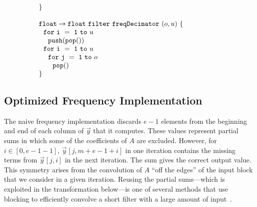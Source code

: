 \begin{transformation}
\begin{equation}
\begin{array}{ll}
    {\tt \}} \\ ~ \\
    {\tt float \rightarrow float}~{\tt filter~freqDecimator~}(o, u){\tt ~\{} & \hspace{40pt}\\
    ~~{\tt for~i~=~1~to~}u \\
    ~~~~{\tt push(pop())} \\
    ~~{\tt for~i~=~1~to~}u \\
    ~~~~{\tt for~j~=~1~to~}o \\
    ~~~~~~{\tt pop()} \\
    {\tt \}}
  \end{array}
\end{equation}
\label{trans:freq1}
\end{transformation}

\subsection{Optimized Frequency Implementation}

The naive frequency implementation discards $e-1$ elements from the
beginning and end of each column of ${\vec y}$ that it computes.
These values represent partial sums in which some of the coefficients
of $A$ are excluded. However, for $i \in [0, e-1-1]$, ${\vec
y}\hspace{1pt}[j,m+e-1+i]$ in one iteration contains the missing terms
from ${\vec y}\hspace{1pt}[j,i]$ in the next iteration. The sum gives
the correct output value.  This symmetry arises from the convolution
of $A$ ``off the edges'' of the input block that we consider in a
given iteration. Reusing the partial sums---which is exploited in the
transformation below---is one of several methods that use blocking to
efficiently convolve a short filter with a large amount of
input~\cite{oppenheim-discrete}.

